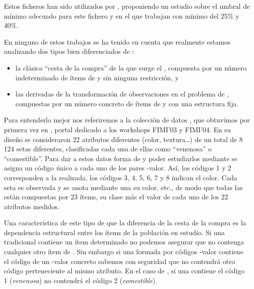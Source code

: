 Estos ficheros han sido utilizados por \cite{JinMcCallenBreitbartFuhryWang-EstimatingTheNumberOfFIInLargeDB-2009}, proponiendo un estudio sobre el umbral de \soporte mínimo adecuado para este fichero y en el que trabajan con \soporte mínimo del 25\% y 40\%.

En ninguno de estos trabajos se ha tenido en cuenta que realmente estamos analizando dos tipos bien diferenciados de \transacciones:
\begin{itemize}
  \item la clásica "`cesta de la compra"' de la que surge el \ARM, compuesta por un número indeterminado de ítems de \I y sin ninguna restricción, y
  \item las \transacciones derivadas de la transformación de observaciones en el problema de \Clasificacion, compuestas por un número concreto de ítems de \I y con una estructura fija.
\end{itemize}

Para entenderlo mejor nos referiremos a la colección de datos \mushroom, que obtuvimos por primera vez en , portal dedicado a los workshops FIMI'03 y FIMI'04. En su diseño se consideraron 22 atributos diferentes (color, textura\ldots) de un total de 8\,124 setas diferentes, clasificadas cada una de ellas como "`venenosa"' o "`comestible"'. Para dar a estos datos forma de \transaccion y poder estudiarlos mediante \ARM se asigna un código único a cada uno de los pares \atributo-valor. Así, los códigos 1 y 2 corresponden a la \clasificacion realizada, los códigos 3, 4, 5, 6, 7 y 8 indican el color. Cada seta es observada y se anota mediante una \transaccion su color, etc., de modo que todas las \transacciones están compuestas por 23 ítems, su clase más el valor de cada uno de los 22 atributos medidos.

Una característica de este tipo de \transaccion que la diferencia de la cesta de la compra es la dependencia estructural entre los ítems de la población en estudio. Si una \transaccion tradicional contiene un ítem determinado no podemos asegurar que no contenga cualquier otro ítem de \I. Sin embargo si una \transaccion formada por códigos \atributo-valor contiene el código de un \atributo-valor concreto sabemos con seguridad que no contendrá otro código perteneciente al mismo atributo. En el caso de \mushroom, si una \transaccion contiene el código 1 (\emph{venenosa}) no contendrá el código 2 (\emph{comestible}).

